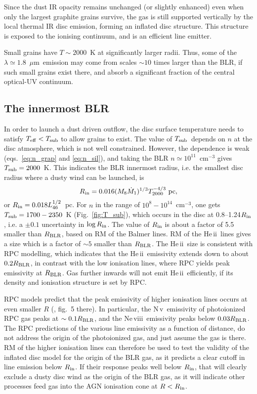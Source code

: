 \documentclass[a4paper,fleqn,usenatbib]{mnras}
\newcommand{\mdot}{\dot{M}}
\newcommand{\mic}{\mbox{$\mu$m}}
\newcommand{\Tsub}{\mbox{$T_{\rm sub}$}}
\newcommand{\HeII}{\mbox{He\,{\sc ii}}}
\newcommand{\NV}{\mbox{N\,{\sc v}}}
\newcommand{\NeVIII}{\mbox{Ne\,{\sc viii}}}
\begin{document}
Since the dust IR opacity remains unchanged (or slightly enhanced) even when only the largest graphite 
grains survive, 
the gas is still supported vertically 
by the local thermal IR disc emission, forming an inflated disc structure. This structure is exposed to the
ionising continuum, and is an efficient line emitter.

Small grains have $T\sim 2000$~K at significantly larger radii. Thus,
some of the $\lambda\simeq 1.8$~\mic\ emission may come from scales $\sim 10$ times larger than the BLR,
if such small grains exist there, and absorb a significant fraction of the central optical-UV continuum.



\subsection{The innermost BLR}

In order to launch a dust driven outflow, the disc surface temperature
needs to satisfy $T_{\rm eff}<\Tsub$ to allow grains to exist. The value of \Tsub\
depends on $n$ at the disc atmosphere, which is not well constrained. However, the dependence 
is weak (eqs.~\ref{eq:n_grap} and \ref{eq:n_sil}), 
and taking the BLR $n\simeq 10^{11}$~cm$^{-3}$ gives $\Tsub=2000$~K. This indicates the BLR 
innermost radius, i.e. the smallest disc radius where a dusty wind can be launched, is
\begin{equation} 
R_{\rm in}=0.016(M_8\mdot_1)^{1/3}T_{2000}^{-4/3}~{\rm pc}, 
\end{equation} 
or $R_{\rm in}=0.018L_{46}^{1/2}$~pc. For $n$ in the range of $10^8-10^{14}$~cm$^{-3}$, one 
gets $\Tsub=1700-2350$~K (Fig.~\ref{fig:T_sub}), which occurs in the disc at 0.8--1.24$R_{\rm in}$,
i.e. a $\pm 0.1$ uncertainty in $\log R_{\rm in}$. The value of $R_{\rm in}$
is about a factor of 5.5 smaller than $R_{\rm BLR}$, based on RM of the Balmer lines.
RM of the \HeII\ lines gives a size which is a factor of $\sim 5$ smaller
than $R_{\rm BLR}$. The \HeII\ size is consistent with RPC modelling, which indicates that the \HeII\ 
emissivity extends 
down to about $0.2R_{\rm BLR}$, in contrast with the low ionisation lines, where RPC yields peak emissivity at 
$R_{\rm BLR}$. Gas further inwards will not emit \HeII\ efficiently,
if its density and ionisation structure is set by RPC.

RPC models predict that the peak emissivity of higher ionisation lines  occurs at even smaller $R$ 
(\citealt{paperII}, fig.~5 there). In particular,
the \NV\ emissivity of photoionized RPC gas peaks at $\sim 0.1R_{\rm BLR}$, and the \NeVIII\ emissivity peaks below  $0.03R_{\rm BLR}$. The RPC predictions of the various line emissivity as a function of
distance, do not address the origin of the photoionized gas, and just assume the gas is there.
RM of the higher ionisation lines can therefore be used to test the validity of the inflated disc 
 model for the origin of the BLR gas, as it predicts a clear cutoff in line emission below $R_{\rm in}$. 
If their response peaks well below $R_{\rm in}$, that will clearly exclude a dusty disc wind as the 
origin of the BLR gas, as it will indicate other processes feed gas into the AGN ionisation cone at
$R<R_{\rm in}$.
\end{document}
